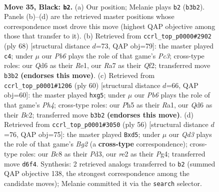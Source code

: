 \documentclass[11pt]{article}
\begin{document}
\clearpage

\begin{figure}[p]\centering
\begin{subfigure}{0.46\textwidth}\centering
\resizebox{\linewidth}{!}{%
\newchessgame
\chessboard[
  setfen={2b2k2/r4p2/3q1np1/1B4Np/P7/1p4P1/3NRP1P/R5K1 b - - 5 35},
  showmover=false,
  pgfstyle=straightmove, color=movearrow, markmove={b3-b2}
]}
\caption{}
\end{subfigure}\hfill
\begin{subfigure}{0.46\textwidth}\centering
\resizebox{\linewidth}{!}{%
\newchessgame
\chessboard[
  setfen={8/1p3rk1/1P1p2p1/3rbp1p/8/2P4P/5QP1/4R2K w - - 0 35},
  showmover=false,
  pgfstyle=straightmove, color=movearrow, markmove={c3-c4}
]}
\caption{}
\end{subfigure}
\\[4pt]
\begin{subfigure}{0.46\textwidth}\centering
\resizebox{\linewidth}{!}{%
\newchessgame
\chessboard[
  setfen={4r1k1/1p3p2/p1pr4/P4bp1/4p2P/2P1Q2n/1PB2P2/R6K w - - 4 31},
  showmover=false,
  pgfstyle=straightmove, color=movearrow, markmove={h4-g5}
]}
\caption{}
\end{subfigure}\hfill
\begin{subfigure}{0.46\textwidth}\centering
\resizebox{\linewidth}{!}{%
\newchessgame
\chessboard[
  setfen={5k2/5ppp/1r1bp3/3n4/1p1N2P1/3PP3/5PBP/1R4K1 w - - 1 29},
  showmover=false,
  pgfstyle=straightmove, color=movearrow, markmove={g2-d5}
]}
\caption{}
\end{subfigure}
\caption{\textbf{Move 35, Black: \texttt{b2}.} (a) Our position; Melanie plays \texttt{b2} (\texttt{b3b2}). Panels (b)--(d) are the retrieved master positions whose correspondence most drove this move (highest QAP objective among those that transfer to it). (b) Retrieved from \texttt{ccrl\_top\_p0000\#2902} (ply 68) [structural distance $d$=73, QAP obj=79]: the master played \texttt{c4}; under $\mu$ our \emph{Pb6} plays the role of that game's \emph{Pc3}; cross-type roles: our \emph{Q}d6 as their \emph{R}e1, our \emph{R}a7 as their \emph{Q}f2; transferred move \texttt{b3b2} \textbf{(endorses this move)}. (c) Retrieved from \texttt{ccrl\_top\_p0001\#1206} (ply 60) [structural distance $d$=66, QAP obj=60]: the master played \texttt{hxg5}; under $\mu$ our \emph{Pb6} plays the role of that game's \emph{Ph4}; cross-type roles: our \emph{P}h5 as their \emph{R}a1, our \emph{Q}d6 as their \emph{B}c2; transferred move \texttt{b3b2} \textbf{(endorses this move)}. (d) Retrieved from \texttt{ccrl\_top\_p0001\#3050} (ply 56) [structural distance $d$=76, QAP obj=75]: the master played \texttt{Bxd5}; under $\mu$ our \emph{Qd3} plays the role of that game's \emph{Bg2} (a \textbf{cross-type} correspondence); cross-type roles: our \emph{B}c8 as their \emph{P}d3, our \emph{r}e2 as their \emph{P}g4; transferred move \texttt{d6f4}. Synthesis: 2 retrieved analogs transferred to \texttt{b2} (summed QAP objective 138, the strongest correspondence among the candidate moves); Melanie committed it via the \texttt{search} selector.}
\label{fig:thought-m69}
\end{figure}
\end{document}
